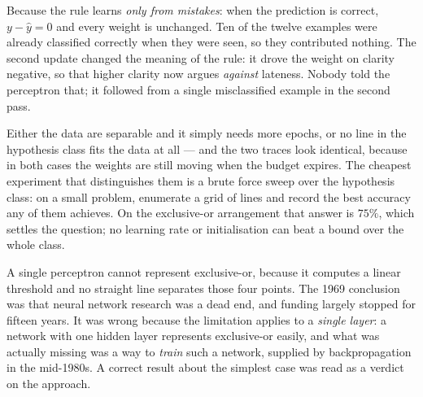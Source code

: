 \begin{ans}
  \item Because the rule learns \emph{only from mistakes}: when the prediction is
        correct, $y - \hat{y} = 0$ and every weight is unchanged. Ten of the twelve
        examples were already classified correctly when they were seen, so they
        contributed nothing. The second update changed the meaning of the rule: it
        drove the weight on clarity negative, so that higher clarity now argues
        \emph{against} lateness. Nobody told the perceptron that; it followed from a
        single misclassified example in the second pass.
  \item Either the data are separable and it simply needs more epochs, or no line in
        the hypothesis class fits the data at all --- and the two traces look
        identical, because in both cases the weights are still moving when the
        budget expires. The cheapest experiment that distinguishes them is a brute
        force sweep over the hypothesis class: on a small problem, enumerate a grid
        of lines and record the best accuracy any of them achieves. On the
        exclusive-or arrangement that answer is $75\%$, which settles the question;
        no learning rate or initialisation can beat a bound over the whole class.
  \item A single perceptron cannot represent exclusive-or, because it computes a
        linear threshold and no straight line separates those four points. The 1969
        conclusion was that neural network research was a dead end, and funding
        largely stopped for fifteen years. It was wrong because the limitation
        applies to a \emph{single layer}: a network with one hidden layer represents
        exclusive-or easily, and what was actually missing was a way to \emph{train}
        such a network, supplied by backpropagation in the mid-1980s. A correct
        result about the simplest case was read as a verdict on the approach.
\end{ans}

